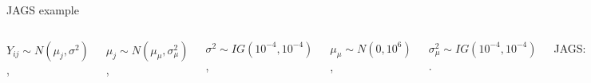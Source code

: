 \begin{frame}[fragile]{JAGS example}
\smallskip

\begin{columns}[c]
\centering
{}
$ Y_{ij} \sim N(\mu_j, \sigma^2)$, 

$ \mu_j \sim N(\mu_{\mu}, \sigma_{\mu}^2)$, 

$ \sigma^2 \sim IG(10^{-4}, 10^{-4})$,

$ \mu_{\mu} \sim N(0, 10^6)$, 

$ \sigma_{\mu}^2 \sim IG(10^{-4}, 10^{-4})$.


JAGS:

\begin{center}
\begin{scriptsize}
\begin{lstlisting}[language=R, frame=leftline]
model {
  tau ~ dgamma(0.001, 0.001) 
  tauMu ~ dgamma(0.001, 0.001)
  muMu ~ dnorm(0,1/100)

  for (j in 1:k) {
    mu[j] ~ dnorm(muMu, tauMu)
    for (i in 1:n[j]) {
      y[j,i] ~ dnorm(mu[j], tau)
    }
  }
 
  sigma2 <- 1 / tau
  sigma2mu <- 1 / tauMu
}
\end{lstlisting}
\end{scriptsize}
\end{center}
\end{columns}
\end{frame}

